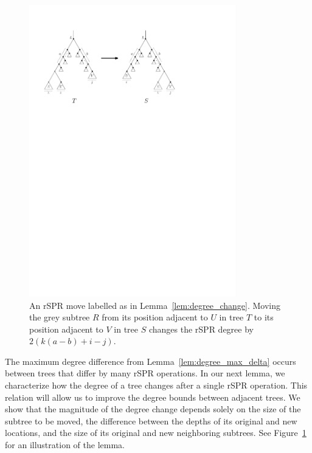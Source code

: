 \documentclass[]{elsarticle}
\let\MYoriglatexcaption\caption
\renewcommand{\caption}[2][\relax]{\MYoriglatexcaption[#2]{#2}}
\begin{document}
\begin{figure}
	\includegraphics[width=0.8\textwidth]{figs/spr-degree-change}
	\caption{An rSPR move labelled as in Lemma~\ref{lem:degree_change}.
Moving the grey subtree $R$ from its position adjacent to $U$ in tree $T$ to its position adjacent to $V$ in tree $S$ changes the rSPR degree by $2\left(k(a-b) + i - j\right)$.}
	\label{fig:spr-degree-change}
\end{figure}

The maximum degree difference from Lemma~\ref{lem:degree_max_delta} occurs between trees that differ by many rSPR operations.
In our next lemma, we characterize how the degree of a tree changes after a single rSPR operation.
This relation will allow us to improve the degree bounds between adjacent trees.
We show that the magnitude of the degree change depends solely on the size of the subtree to be moved, the difference between the depths of its original and new locations, and the size of its original and new neighboring subtrees.
See Figure~\ref{fig:spr-degree-change} for an illustration of the lemma.
\end{document}
